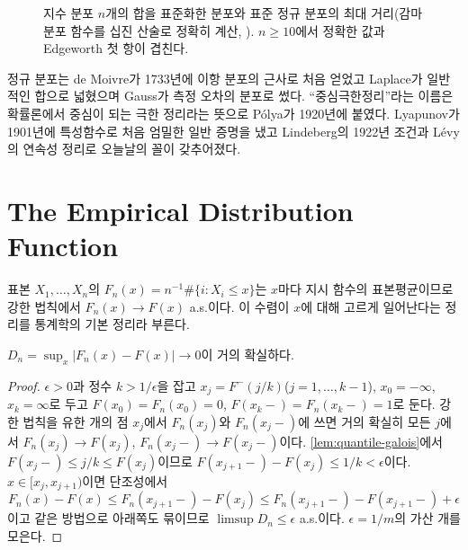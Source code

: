 \begin{figure}[htbp]
\centering
{}
\caption{지수 분포 $n$개의 합을 표준화한 분포와 표준 정규 분포의 최대 거리(감마 분포 함수를 십진 산술로 정확히 계산, ). $n\ge10$에서 정확한 값과 Edgeworth 첫 항이 겹친다.}
\label{fig:clt}
\end{figure}

\begin{aside}
정규 분포는 de Moivre가 1733년에 이항 분포의 근사로 처음 얻었고 Laplace가 일반적인 합으로 넓혔으며 Gauss가 측정 오차의 분포로 썼다. ``중심극한정리''라는 이름은 확률론에서 중심이 되는 극한 정리라는 뜻으로 P\'olya가 1920년에 붙였다\cite{polya1920}. Lyapunov가 1901년에 특성함수로 처음 엄밀한 일반 증명을 냈고 Lindeberg의 1922년 조건과 L\'evy의 연속성 정리로 오늘날의 꼴이 갖추어졌다.
\end{aside}

\section{The Empirical Distribution Function}
\label{sec:ecdf}

표본 $X_1,\dots,X_n$의  $F_n(x)=n^{-1}\#\{i:X_i\le x\}$는 $x$마다 지시 함수의 표본평균이므로 강한 법칙에서 $F_n(x)\to F(x)$ a.s.이다. 이 수렴이 $x$에 대해 고르게 일어난다는 정리를 통계학의 기본 정리라 부른다.

\begin{theorem}
\label{thm:glivenko-cantelli}
$D_n=\sup_x|F_n(x)-F(x)|\to0$이 거의 확실하다.
\end{theorem}

\begin{proof}
$\epsilon>0$과 정수 $k>1/\epsilon$을 잡고 $x_j=F^{-}(j/k)$($j=1,\dots,k-1$), $x_0=-\infty$, $x_k=\infty$로 두고 $F(x_0)=F_n(x_0)=0$, $F(x_k-)=F_n(x_k-)=1$로 둔다. 강한 법칙을 유한 개의 점 $x_j$에서 $F_n(x_j)$와 $F_n(x_j-)$에 쓰면 거의 확실히 모든 $j$에서 $F_n(x_j)\to F(x_j)$, $F_n(x_j-)\to F(x_j-)$이다. \cref{lem:quantile-galois}에서 $F(x_{j}-)\le j/k\le F(x_j)$이므로 $F(x_{j+1}-)-F(x_j)\le1/k<\epsilon$이다. $x\in[x_j,x_{j+1})$이면 단조성에서
\[
F_n(x)-F(x)\le F_n(x_{j+1}-)-F(x_j)\le F_n(x_{j+1}-)-F(x_{j+1}-)+\epsilon
\]
이고 같은 방법으로 아래쪽도 묶이므로 $\limsup D_n\le\epsilon$ a.s.이다. $\epsilon=1/m$의 가산 개를 모은다.
\end{proof}

